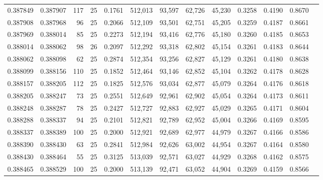 \begin{tabular}{rrrrrrrrrrrrr}
0.387849 & 0.387907 &   117 &  25 &                                     0.1761 & 512,013 &  93,597 &  62,726 &  45,230 & 0.3258 & 0.4190 & 0.8670 \\
0.387908 & 0.387968 &    96 &  25 &                                     0.2066 & 512,109 &  93,501 &  62,751 &  45,205 & 0.3259 & 0.4187 & 0.8661 \\
0.387969 & 0.388014 &    85 &  25 &                                     0.2273 & 512,194 &  93,416 &  62,776 &  45,180 & 0.3260 & 0.4185 & 0.8653 \\
0.388014 & 0.388062 &    98 &  26 &                                     0.2097 & 512,292 &  93,318 &  62,802 &  45,154 & 0.3261 & 0.4183 & 0.8644 \\
0.388062 & 0.388098 &    62 &  25 &                                     0.2874 & 512,354 &  93,256 &  62,827 &  45,129 & 0.3261 & 0.4180 & 0.8638 \\
0.388099 & 0.388156 &   110 &  25 &                                     0.1852 & 512,464 &  93,146 &  62,852 &  45,104 & 0.3262 & 0.4178 & 0.8628 \\
0.388157 & 0.388205 &   112 &  25 &                                     0.1825 & 512,576 &  93,034 &  62,877 &  45,079 & 0.3264 & 0.4176 & 0.8618 \\
0.388205 & 0.388247 &    73 &  25 &                                     0.2551 & 512,649 &  92,961 &  62,902 &  45,054 & 0.3264 & 0.4173 & 0.8611 \\
0.388248 & 0.388287 &    78 &  25 &                                     0.2427 & 512,727 &  92,883 &  62,927 &  45,029 & 0.3265 & 0.4171 & 0.8604 \\
0.388288 & 0.388337 &    94 &  25 &                                     0.2101 & 512,821 &  92,789 &  62,952 &  45,004 & 0.3266 & 0.4169 & 0.8595 \\
0.388337 & 0.388389 &   100 &  25 &                                     0.2000 & 512,921 &  92,689 &  62,977 &  44,979 & 0.3267 & 0.4166 & 0.8586 \\
0.388390 & 0.388430 &    63 &  25 &                                     0.2841 & 512,984 &  92,626 &  63,002 &  44,954 & 0.3267 & 0.4164 & 0.8580 \\
0.388430 & 0.388464 &    55 &  25 &                                     0.3125 & 513,039 &  92,571 &  63,027 &  44,929 & 0.3268 & 0.4162 & 0.8575 \\
0.388465 & 0.388529 &   100 &  25 &                                     0.2000 & 513,139 &  92,471 &  63,052 &  44,904 & 0.3269 & 0.4159 & 0.8566 \\

\end{tabular}
